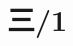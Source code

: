 \documentclass[11pt,a4paper]{article}
\author{刘逸灏 (515370910207)}
\begin{document}
\maketitle

\section{三/1}
\end{document}
